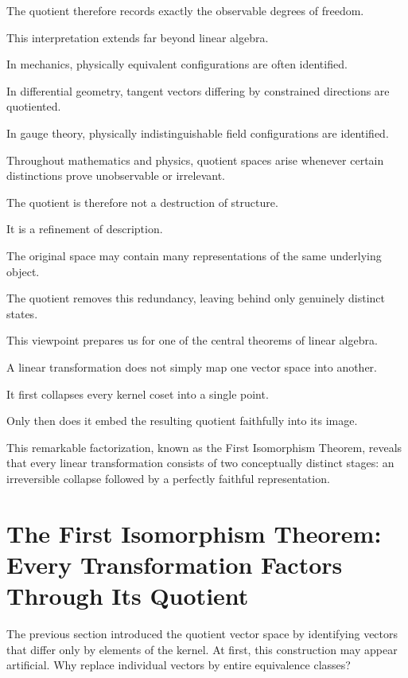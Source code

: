 \documentclass[11pt]{book}
\numberwithin{equation}{chapter}
\theoremstyle{definition}
\theoremstyle{plain}
\theoremstyle{remark}
\begin{document}
The quotient therefore records exactly the observable degrees of freedom.

This interpretation extends far beyond linear algebra.

In mechanics, physically equivalent configurations are often identified.

In differential geometry, tangent vectors differing by constrained directions are quotiented.

In gauge theory, physically indistinguishable field configurations are identified.

Throughout mathematics and physics, quotient spaces arise whenever certain distinctions prove unobservable or irrelevant.

The quotient is therefore not a destruction of structure.

It is a refinement of description.

The original space may contain many representations of the same underlying object.

The quotient removes this redundancy, leaving behind only genuinely distinct states.

This viewpoint prepares us for one of the central theorems of linear algebra.

A linear transformation does not simply map one vector space into another.

It first collapses every kernel coset into a single point.

Only then does it embed the resulting quotient faithfully into its image.

This remarkable factorization, known as the First Isomorphism Theorem, reveals that every linear transformation consists of two conceptually distinct stages: an irreversible collapse followed by a perfectly faithful representation.


\section{The First Isomorphism Theorem: Every Transformation Factors Through Its Quotient}

The previous section introduced the quotient vector space by identifying vectors that differ only by elements of the kernel. At first, this construction may appear artificial. Why replace individual vectors by entire equivalence classes?
\end{document}
